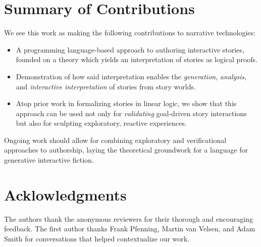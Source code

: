 \documentclass[letterpaper]{article}
\begin{document}
\section{Summary of Contributions}

We see this work as making the following contributions to
narrative technologies:
\begin{itemize}
\item A programming language-based approach to authoring interactive
stories, founded on a theory which yields an interpretation of stories as
logical proofs.
\item Demonstration of how said interpretation enables the {\em generation},
{\em analysis}, and {\em interactive interpretation} of stories from
story worlds. 
\item Atop prior work in formalizing stories in linear logic,
we show that this approach can be used not only for {\em validating}
goal-driven story interactions but also for sculpting exploratory,
reactive experiences.
\end{itemize}

Ongoing work should allow for combining exploratory and verificational
approaches to authorship, laying the theoretical groundwork for a
language for generative interactive fiction.

\section{Acklowledgments}

The authors thank the anonymous reviewers for their thorough and
encouraging feedback. The first author thanks Frank Pfenning, Martin van Velsen,
and Adam Smith for conversations that helped contextualize our work.




\end{document}
